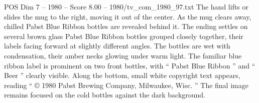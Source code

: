 \begin{textsample}{POS Dim 7 – 1980 – Score 8.00 – 1980/tv\_com\_1980\_97.txt}
The hand lifts or slides the mug to the right, moving it out of the center.
As the mug clears away, chilled Pabst Blue Ribbon bottles are revealed behind it.
The ending settles on several brown glass Pabst Blue Ribbon bottles grouped closely together, their labels facing forward at slightly different angles.
The bottles are wet with condensation, their amber necks glowing under warm light.
The familiar blue ribbon label is prominent on two front bottles, with “ Pabst Blue Ribbon ” and “ Beer ” clearly visible.
Along the bottom, small white copyright text appears, reading “ {\EmojiFont ©} 1980 Pabst Brewing Company, Milwaukee, Wisc. ” The final image remains focused on the cold bottles against the dark background.

\end{textsample}
